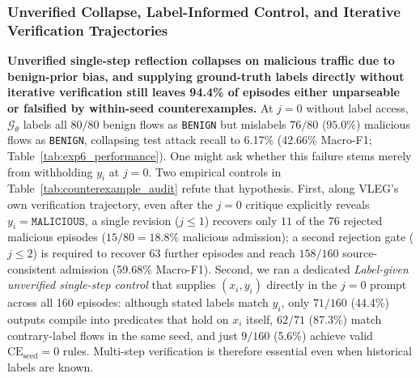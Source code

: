 \documentclass[11pt,letterpaper,onecolumn]{article}
\begin{document}
\subsubsection{Unverified Collapse, Label-Informed Control, and Iterative Verification Trajectories}
\textbf{Unverified single-step reflection collapses on malicious traffic due to benign-prior bias, and supplying ground-truth labels directly without iterative verification still leaves 94.4\% of episodes either unparseable or falsified by within-seed counterexamples.} At $j=0$ without label access, $\mathcal{G}_\theta$ labels all $80/80$ benign flows as \texttt{BENIGN} but mislabels $76/80$ ($95.0\%$) malicious flows as \texttt{BENIGN}, collapsing test attack recall to 6.17\% (42.66\% Macro-F1; Table~\ref{tab:exp6_performance}). One might ask whether this failure stems merely from withholding $y_i$ at $j=0$. Two empirical controls in Table~\ref{tab:counterexample_audit} refute that hypothesis. First, along VLEG's own verification trajectory, even after the $j=0$ critique explicitly reveals $y_i = \texttt{MALICIOUS}$, a single revision ($j \le 1$) recovers only $11$ of the $76$ rejected malicious episodes ($15/80 = 18.8\%$ malicious admission); a second rejection gate ($j \le 2$) is required to recover $63$ further episodes and reach $158/160$ source-consistent admission (59.68\% Macro-F1). Second, we ran a dedicated \emph{Label-given unverified single-step control} that supplies $(x_i, y_i)$ directly in the $j=0$ prompt across all 160 episodes: although stated labels match $y_i$, only $71/160$ (44.4\%) outputs compile into predicates that hold on $x_i$ itself, $62/71$ (87.3\%) match contrary-label flows in the same seed, and just $9/160$ (5.6\%) achieve valid $\mathrm{CE}_{\mathrm{seed}}=0$ rules. Multi-step verification is therefore essential even when historical labels are known.
\end{document}
